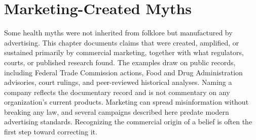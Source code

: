 \documentclass[11pt,oneside]{book}
\begin{document}
\chapter{Marketing-Created Myths}
Some health myths were not inherited from folklore but manufactured by advertising. This chapter documents claims that were created, amplified, or sustained primarily by commercial marketing, together with what regulators, courts, or published research found. The examples draw on public records, including Federal Trade Commission actions, Food and Drug Administration advisories, court rulings, and peer-reviewed historical analyses. Naming a company reflects the documentary record and is not commentary on any organization's current products. Marketing can spread misinformation without breaking any law, and several campaigns described here predate modern advertising standards. Recognizing the commercial origin of a belief is often the first step toward correcting it.
\end{document}
